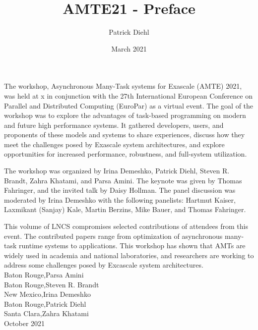 \documentclass{article}
\title{AMTE21 - Preface}
\author{Patrick Diehl}
\date{March 2021}
\begin{document}
\noindent The workshop, Asynchronous Many-Task systems for Exascale (AMTE) 2021, was held at x in conjunction with the 27th International European Conference on Parallel and Distributed Computing (EuroPar) as a virtual event. The goal of the workshop was to explore the advantages of task-based programming on modern and future high performance systems. It gathered developers, users, and proponents of these models and systems to share experiences, discuss how they meet the challenges posed by Exascale system architectures, and explore opportunities for increased performance, robustness, and full-system utilization.

The workshop was organized by Irina Demeshko, Patrick Diehl, Steven R. Brandt, Zahra Khatami, and Parsa Amini. The keynote was given by Thomas Fahringer, and the invited talk by Daisy Hollman. The panel discussion was moderated by Irina Demeshko with the following panelists: Hartmut Kaiser, Laxmikant (Sanjay) Kale, Martin Berzins, Mike Bauer, and Thomas Fahringer.

This volume of LNCS compromises selected contributions of attendees from this event. The contributed papers range from optimization of asynchronous many-task runtime systems to applications. This workshop has shown that AMTs are widely used in academia and national laboratories, and researchers are working to address some challenges posed by Excascale system architectures.\\

\noindent
Baton Rouge,\hfill Parsa Amini\\
Baton Rouge,\hfill Steven R. Brandt\\
New Mexico,\hfill Irina Demeshko\\
Baton Rouge,\hfill Patrick Diehl\\
Santa Clara,\hfill Zahra Khatami\\

\noindent
October 2021
\end{document}
